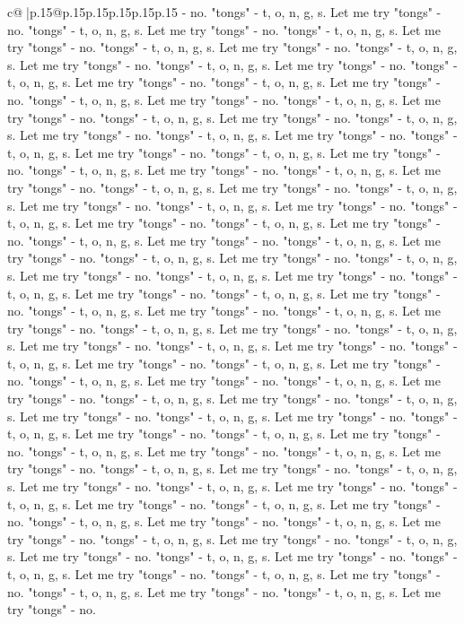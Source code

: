 \documentclass{article}
\begin{document}
{\begin{supertabular}{c@{$\;$}|p{.15\linewidth}@{}p{.15\linewidth}p{.15\linewidth}p{.15\linewidth}p{.15\linewidth}p{.15\linewidth}}
{{{{-} no. "tongs" {-} t, o, n, g, s. Let me try "tongs" {-} no. "tongs" {-} t, o, n, g, s. Let me try "tongs" {-} no. "tongs" {-} t, o, n, g, s. Let me try "tongs" {-} no. "tongs" {-} t, o, n, g, s. Let me try "tongs" {-} no. "tongs" {-} t, o, n, g, s. Let me try "tongs" {-} no. "tongs" {-} t, o, n, g, s. Let me try "tongs" {-} no. "tongs" {-} t, o, n, g, s. Let me try "tongs" {-} no. "tongs" {-} t, o, n, g, s. Let me try "tongs" {-} no. "tongs" {-} t, o, n, g, s. Let me try "tongs" {-} no. "tongs" {-} t, o, n, g, s. Let me try "tongs" {-} no. "tongs" {-} t, o, n, g, s. Let me try "tongs" {-} no. "tongs" {-} t, o, n, g, s. Let me try "tongs" {-} no. "tongs" {-} t, o, n, g, s. Let me try "tongs" {-} no. "tongs" {-} t, o, n, g, s. Let me try "tongs" {-} no. "tongs" {-} t, o, n, g, s. Let me try "tongs" {-} no. "tongs" {-} t, o, n, g, s. Let me try "tongs" {-} no. "tongs" {-} t, o, n, g, s. Let me try "tongs" {-} no. "tongs" {-} t, o, n, g, s. Let me try "tongs" {-} no. "tongs" {-} t, o, n, g, s. Let me try "tongs" {-} no. "tongs" {-} t, o, n, g, s. Let me try "tongs" {-} no. "tongs" {-} t, o, n, g, s. Let me try "tongs" {-} no. "tongs" {-} t, o, n, g, s. Let me try "tongs" {-} no. "tongs" {-} t, o, n, g, s. Let me try "tongs" {-} no. "tongs" {-} t, o, n, g, s. Let me try "tongs" {-} no. "tongs" {-} t, o, n, g, s. Let me try "tongs" {-} no. "tongs" {-} t, o, n, g, s. Let me try "tongs" {-} no. "tongs" {-} t, o, n, g, s. Let me try "tongs" {-} no. "tongs" {-} t, o, n, g, s. Let me try "tongs" {-} no. "tongs" {-} t, o, n, g, s. Let me try "tongs" {-} no. "tongs" {-} t, o, n, g, s. Let me try "tongs" {-} no. "tongs" {-} t, o, n, g, s. Let me try "tongs" {-} no. "tongs" {-} t, o, n, g, s. Let me try "tongs" {-} no. "tongs" {-} t, o, n, g, s. Let me try "tongs" {-} no. "tongs" {-} t, o, n, g, s. Let me try "tongs" {-} no. "tongs" {-} t, o, n, g, s. Let me try "tongs" {-} no. "tongs" {-} t, o, n, g, s. Let me try "tongs" {-} no. "tongs" {-} t, o, n, g, s. Let me try "tongs" {-} no. "tongs" {-} t, o, n, g, s. Let me try "tongs" {-} no. "tongs" {-} t, o, n, g, s. Let me try "tongs" {-} no. "tongs" {-} t, o, n, g, s. Let me try "tongs" {-} no. "tongs" {-} t, o, n, g, s. Let me try "tongs" {-} no. "tongs" {-} t, o, n, g, s. Let me try "tongs" {-} no. "tongs" {-} t, o, n, g, s. Let me try "tongs" {-} no. "tongs" {-} t, o, n, g, s. Let me try "tongs" {-} no. "tongs" {-} t, o, n, g, s. Let me try "tongs" {-} no. "tongs" {-} t, o, n, g, s. Let me try "tongs" {-} no. "tongs" {-} t, o, n, g, s. Let me try "tongs" {-} no. "tongs" {-} t, o, n, g, s. Let me try "tongs" {-} no. "tongs" {-} t, o, n, g, s. Let me try "tongs" {-} no. "tongs" {-} t, o, n, g, s. Let me try "tongs" {-} no. "tongs" {-} t, o, n, g, s. Let me try "tongs" {-} no. "tongs" {-} t, o, n, g, s. Let me try "tongs" {-} no. "tongs" {-} t, o, n, g, s. Let me try "tongs" {-} no. "tongs" {-} t, o, n, g, s. Let me try "tongs" {-} no. "tongs" {-} t, o, n, g, s. Let me try "tongs" {-} no. "tongs" {-} t, o, n, g, s. Let me try "tongs" {-} no. "tongs" {-} t, o, n, g, s. Let me try "tongs" {-} no. "tongs" {-} t, o, n, g, s. Let me try "tongs" {-} no. "tongs" {-} t, o, n, g, s. Let me try "tongs" {-} no. }}}
\end{supertabular}}
\end{document}
